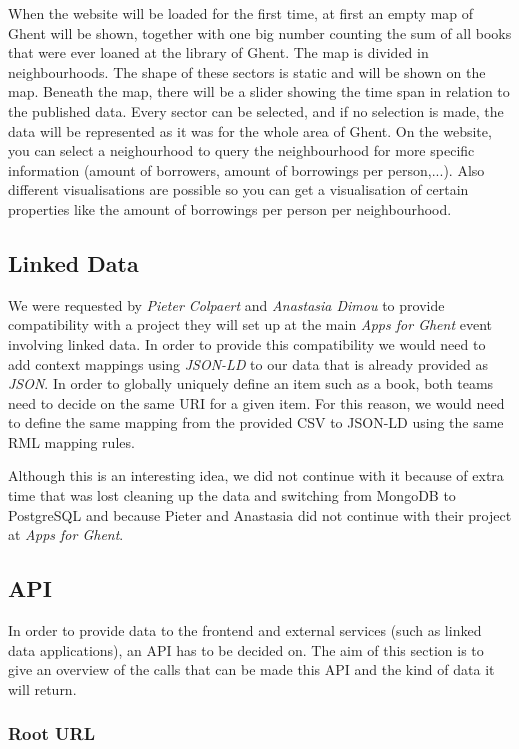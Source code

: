 When the website will be loaded for the first time, at first an empty map of Ghent will be shown, together with one big number counting the sum of all books that were ever loaned at the library of Ghent. The map is divided in neighbourhoods. The shape of these sectors is static and will be shown on the map. Beneath the map, there will be a slider showing the time span in relation to the published data. Every sector can be selected, and if no selection is made, the data will be represented as it was for the whole area of Ghent.  On the website, you can select a neighourhood to query the neighbourhood for more specific information (amount of borrowers, amount of borrowings per person,...). Also different visualisations are possible so you can get a visualisation of certain properties like the amount of borrowings per person per neighbourhood.

\subsection{Linked Data}

We were requested by \emph{Pieter Colpaert} and \emph{Anastasia Dimou} to provide compatibility with a project they will set up at the main \emph{Apps for Ghent} event involving linked data. In order to provide this compatibility we would need to add context mappings using \emph{JSON-LD} to our data that is already provided as \emph{JSON}. In order to globally uniquely define an item such as a book, both teams need to decide on the same URI for a given item. For this reason, we would need to define the same mapping from the provided CSV to JSON-LD using the same RML mapping rules.

Although this is an interesting idea, we did not continue with it because of extra time that was lost cleaning up the data and switching from MongoDB to PostgreSQL and because Pieter and Anastasia did not continue with their project at \emph{Apps for Ghent}.

\subsection{API}

In order to provide data to the frontend and external services (such as linked data applications), an API has to be decided on. The aim of this section is to give an overview of the calls that can be made this API and the kind of data it will return.

\subsubsection{Root URL}

